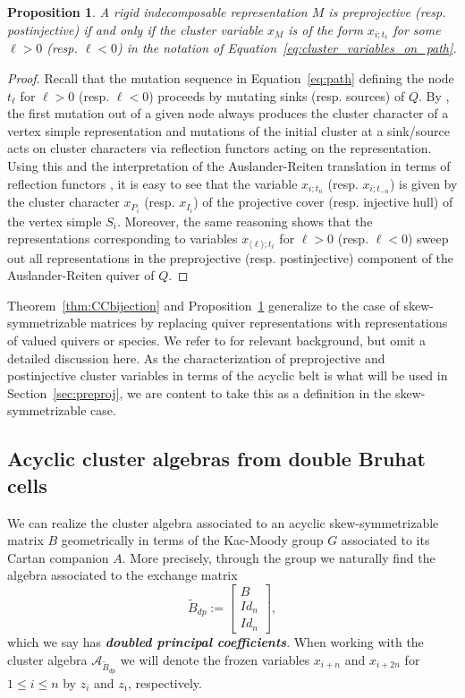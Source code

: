 \documentclass[12pt]{amsart}
\newcommand{\newword}[1]{\textbf{\emph{#1}}}
\newcommand{\cA}{\mathcal{A}}
\newcommand{\ol}[1]{\overline{#1}}
\newcommand{\Bdp}{\widetilde{B}_{dp}}
\newcommand{\Qrep}{M}
\newcommand{\Zidx}{\ell}
\newcommand{\cvar}{z}
\newtheorem{proposition}[theorem]{Proposition}
\theoremstyle{remark}
\numberwithin{equation}{section}
\numberwithin{figure}{section}
\begin{document}
\begin{proposition}
  \label{prop:ccvsacyclicbelt}
  A rigid indecomposable representation $\Qrep$ is preprojective (resp. postinjective) if and only if the cluster variable $x_M$ is of the form $x_{i;t_\Zidx}$ for some $\Zidx > 0$ (resp. $\Zidx < 0$) in the notation of Equation~\eqref{eq:cluster_variables_on_path}.
\end{proposition}
\begin{proof}
  Recall that the mutation sequence in Equation~\eqref{eq:path} defining the node $t_\Zidx$ for $\Zidx>0$ (resp. $\Zidx<0$) proceeds by mutating sinks (resp. sources) of $Q$.
  By \cite{DWZ10,Ru11}, the first mutation out of a given node always produces the cluster character of a vertex simple representation and mutations of the initial cluster at a sink/source acts on cluster characters via reflection functors acting on the representation.
  Using this and the interpretation of the Auslander-Reiten translation in terms of reflection functors \cite{BB76}, it is easy to see that the variable $x_{i;t_n}$ (resp. $x_{i;t_{-n}}$) is given by the cluster character $x_{P_i}$ (resp. $x_{I_i}$) of the projective cover (resp. injective hull) of the vertex simple $S_i$.
  Moreover, the same reasoning shows that the representations corresponding to variables $x_{\langle\Zidx\rangle;t_{\Zidx}}$ for $\Zidx>0$ (resp. $\Zidx<0$) sweep out all representations in the preprojective (resp. postinjective) component of the Auslander-Reiten quiver of $Q$.
\end{proof}

Theorem~\ref{thm:CCbijection} and Proposition~\ref{prop:ccvsacyclicbelt} generalize to the case of skew-symmetrizable matrices by replacing quiver representations with representations of valued quivers or species.
We refer to \cite{Ru11,Ru15} for relevant background, but omit a detailed discussion here.
As the characterization of preprojective and postinjective cluster variables in terms of the acyclic belt is what will be used in Section~\ref{sec:preproj}, we are content to take this as a definition in the skew-symmetrizable case.

\subsection{Acyclic cluster algebras from double Bruhat cells}
\label{sec:Coxeterdbc}

We can realize the cluster algebra associated to an acyclic skew-symmetrizable matrix $B$ geometrically in terms of the Kac-Moody group $G$ associated to its Cartan companion $A$.
More precisely, through the group we naturally find the algebra associated to the exchange matrix
\[
  \Bdp := \begin{bmatrix} B \\ Id_n \\ Id_n \end{bmatrix},
\]
which we say has \newword{doubled principal coefficients}.
When working with the cluster algebra $\cA_{\Bdp}$ we will denote the frozen variables $x_{i+n}$ and $x_{i+2n}$ for $1 \leq i \leq n$ by $\cvar_i$ and $\cvar_{\ol{\imath}}$, respectively.
\end{document}
